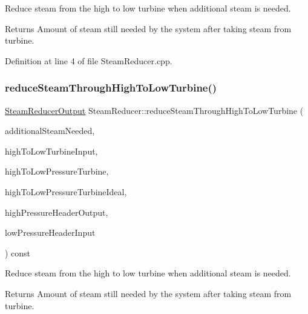 Reduce steam from the high to low turbine when additional steam is needed. \begin{DoxyReturn}{Returns}
Amount of steam still needed by the system after taking steam from turbine. 
\end{DoxyReturn}


Definition at line 4 of file Steam\+Reducer.\+cpp.

\mbox{\label{class_steam_reducer_a87ac83f6821db20e9908ee03b18c81b4}} 
\subsubsection{\texorpdfstring{reduce\+Steam\+Through\+High\+To\+Low\+Turbine()}{reduceSteamThroughHighToLowTurbine()}\hspace{0.1cm}{\footnotesize\ttfamily [2/3]}}
{\footnotesize\ttfamily \hyperlink{class_steam_reducer_output}{Steam\+Reducer\+Output} Steam\+Reducer\+::reduce\+Steam\+Through\+High\+To\+Low\+Turbine (\begin{DoxyParamCaption}\item[{const double}]{additional\+Steam\+Needed,  }\item[{const \hyperlink{class_pressure_turbine}{Pressure\+Turbine} \&}]{high\+To\+Low\+Turbine\+Input,  }\item[{const std\+::shared\+\_\+ptr$<$ \hyperlink{class_turbine}{Turbine} $>$ \&}]{high\+To\+Low\+Pressure\+Turbine,  }\item[{const std\+::shared\+\_\+ptr$<$ \hyperlink{class_turbine}{Turbine} $>$ \&}]{high\+To\+Low\+Pressure\+Turbine\+Ideal,  }\item[{const \hyperlink{struct_steam_system_modeler_tool_1_1_fluid_properties}{Steam\+System\+Modeler\+Tool\+::\+Fluid\+Properties} \&}]{high\+Pressure\+Header\+Output,  }\item[{const std\+::shared\+\_\+ptr$<$ \hyperlink{class_header_not_highest_pressure}{Header\+Not\+Highest\+Pressure} $>$ \&}]{low\+Pressure\+Header\+Input }\end{DoxyParamCaption}) const}

Reduce steam from the high to low turbine when additional steam is needed. \begin{DoxyReturn}{Returns}
Amount of steam still needed by the system after taking steam from turbine. 
\end{DoxyReturn}
\mbox{\label{class_steam_reducer_a87ac83f6821db20e9908ee03b18c81b4}} 
